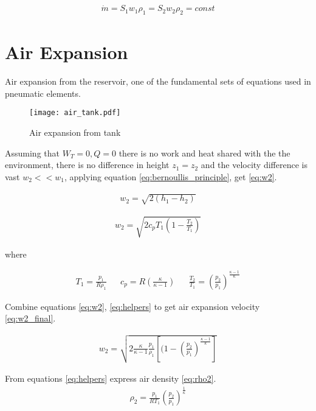 \begin{align}
    \dot{m} = S_1 w_1 \rho_1 = S_2 w_2 \rho_2 = const
    \label{eq:continuity_equation}
\end{align}

\section{Air Expansion}
Air expansion from the reservoir, one of the fundamental sets of equations
used in pneumatic elements. 

\begin{figure}[h!]
    \centering
    \texttt{[image: air\_tank.pdf]}
    \caption{Air expansion from tank}
    \label{fig:air_expansion}
\end{figure}

Assuming that $W_T = 0, Q = 0$ there is no work and heat shared with the
the environment, there is no difference in height $z_1 = z_2$ and
the velocity difference is vast $w_2 << w_1$, applying equation
\ref{eq:bernoullis_principle}, get \ref{eq:w2}.


\begin{align}
    w_2 = \sqrt{2(h_1 - h_2)}
    \label{eq:w2}
\end{align}

\begin{align}
    w_2 = \sqrt{2c_p T_1 \left(1-\frac{T_2}{T_1}\right)}
    \label{eq:w2}
\end{align}

where 

\begin{align}
    T_1 = \frac{p_1}{R \rho_1} && 
    c_p = R  \left( \frac{\kappa}{\kappa-1} \right)   &&
    \frac{T_2}{T_1} = \left(\frac{p_2}{p_1} \right)^{\frac{\kappa - 1}{\kappa}}
    \label{eq:helpers}
\end{align}

Combine equations \ref{eq:w2}, \ref{eq:helpers} to get air expansion
velocity \ref{eq:w2_final}.

\begin{align}
    w_2 =
    \sqrt{2 \frac{\kappa}{\kappa-1} \frac{p_1}{\rho_1} 
    \left[(1-\left(\frac{p_2}{p_1}\right)^\frac{\kappa-1}{\kappa}\right]}
    \label{eq:w2_final}
\end{align}

From equations \ref{eq:helpers} express air density \ref{eq:rho2}.
\begin{align}
    \rho_2 = \frac{p_1}{RT_1} \left(\frac{p_2}{p_1}\right)^{\frac{1}{\kappa}}
    \label{eq:rho2}
\end{align}

